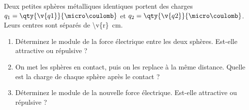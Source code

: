 Deux petites sphères métalliques identiques portent des charges $q_1 = \qty{\v{q1}}{\micro\coulomb}$ et $q_2 = \qty{\v{q2}}{\micro\coulomb}$. Leurs centres sont séparés de \qty{\v{r}}{cm}.

\begin{enumerate}[label=\alph*)]
    \item Déterminez le module de la force électrique entre les deux sphères. Est-elle attractive ou répulsive ?
    \item On met les sphères en contact, puis on les replace à la même distance. Quelle est la charge de chaque sphère après le contact ?
    \item Déterminez le module de la nouvelle force électrique. Est-elle attractive ou répulsive ?
\end{enumerate}
